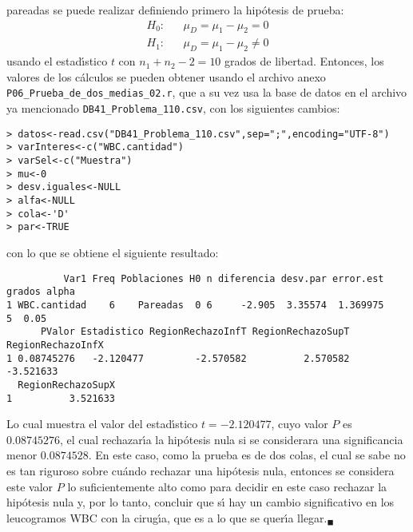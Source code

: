 \begin{solucion}
 pareadas se puede realizar definiendo primero la hip\'otesis de prueba:
 \begin{eqnarray*}
  H_0: & & \mu_D = \mu_1 - \mu_2  =   0 \\
  H_1: & & \mu_D = \mu_1 - \mu_2 \neq 0
 \end{eqnarray*}
 usando el estad\'{\i}stico $t$ con $n_1 + n_2 - 2 = 10$ grados
 de libertad.
 Entonces, los valores de los c\'alculos se pueden obtener
 usando el archivo anexo
 \texttt{P06\_Prueba\_de\_dos\_medias\_02.r},
 que a su vez usa la base de datos en el archivo ya mencionado
 \texttt{DB41\_Problema\_110.csv}, con los siguientes cambios:
 \begin{verbatim}
> datos<-read.csv("DB41_Problema_110.csv",sep=";",encoding="UTF-8")
> varInteres<-c("WBC.cantidad")
> varSel<-c("Muestra")
> mu<-0
> desv.iguales<-NULL
> alfa<-NULL
> cola<-'D'
> par<-TRUE
 \end{verbatim}
 \vspace{-0.5cm}
 con lo que se obtiene el siguiente resultado:
 \begin{verbatim}
          Var1 Freq Poblaciones H0 n diferencia desv.par error.est grados alpha
1 WBC.cantidad    6    Pareadas  0 6     -2.905  3.35574  1.369975      5  0.05
      PValor Estadistico RegionRechazoInfT RegionRechazoSupT RegionRechazoInfX
1 0.08745276   -2.120477         -2.570582          2.570582         -3.521633
  RegionRechazoSupX
1          3.521633
 \end{verbatim}
 \vspace{-0.5cm}
 Lo cual muestra el valor del estad\'{\i}stico $t = -2.120477$,
 cuyo valor $P$ es $0.08745276$, el cual rechazar\'{\i}a la hip\'otesis
 nula si se considerara una significancia menor $0.0874528$.
 En este caso, como la prueba es de dos colas, el cual se sabe
 no es tan riguroso sobre cu\'ando rechazar una hip\'otesis nula, 
 entonces se considera este valor $P$ lo suficientemente alto
 como para decidir en este caso rechazar la hip\'otesis nula
 y, por lo tanto, concluir que s\'{\i} hay un cambio significativo
 en los leucogramos WBC con la cirug\'{\i}a,
 que es a lo que se quer\'{\i}a llegar.${}_{\blacksquare}$
\end{solucion}
